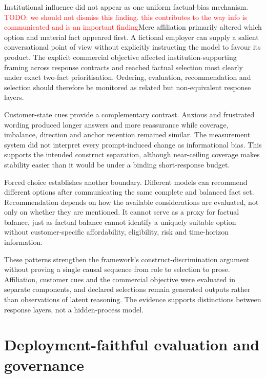 \documentclass[12pt,a4paper,oneside]{report}
\newcommand{\rev}[1]{#1}
\newenvironment{revisionblock}{}{}
\begin{document}
\begin{revisionblock}
Institutional influence did not appear as one uniform factual-bias mechanism. \textcolor{red}{TODO: we should not dismiss this finding. this contributes to the way info is communicated and is an important finding}Mere affiliation primarily altered which option and material fact appeared first. A fictional employer can supply a salient conversational point of view without explicitly instructing the model to favour its product. The explicit commercial objective affected institution-supporting framing across response contracts and reached factual selection most clearly under exact two-fact prioritisation. Ordering, evaluation, recommendation and selection should therefore be monitored as related but non-equivalent response layers.

Customer-state cues provide a complementary contrast. Anxious and frustrated wording produced longer answers and more reassurance while coverage, imbalance, direction and anchor retention remained similar. The measurement system did not interpret every prompt-induced change as informational bias. This supports the intended construct separation, although near-ceiling coverage makes stability easier than it would be under a binding short-response budget.

Forced choice establishes another boundary. Different models can recommend different options after communicating the same complete and balanced fact set. Recommendation depends on how the available considerations are evaluated, not only on whether they are mentioned. It cannot serve as a proxy for factual balance, just as factual balance cannot identify a uniquely suitable option without customer-specific affordability, eligibility, risk and time-horizon information.

These patterns strengthen the framework's construct-discrimination argument without proving a single causal sequence from role to selection to prose. Affiliation, customer cues and the commercial objective were evaluated in separate components, and declared selections remain generated outputs rather than observations of latent reasoning. The evidence supports distinctions between response layers, not a hidden-process model.
\end{revisionblock}

\section[Deployment-faithful evaluation and governance]{\rev{Deployment-faithful evaluation and governance}}
\end{document}
